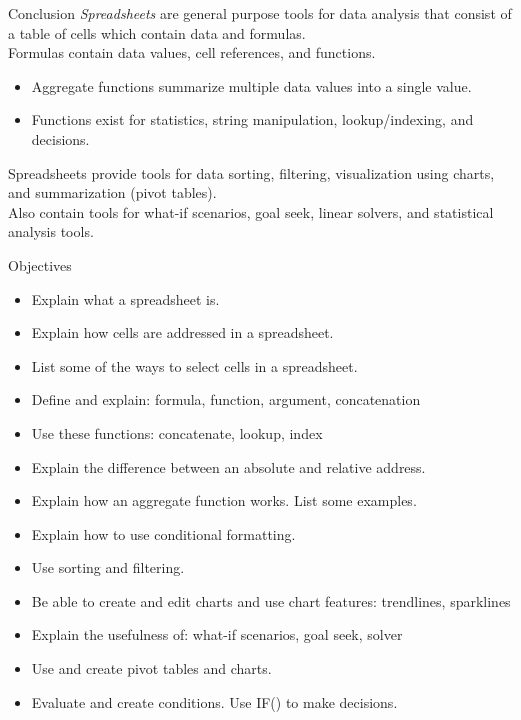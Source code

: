 \documentclass[xcolor=svgnames, handout]{beamer}
\begin{document}
\begin{frame}[label=current]{Conclusion}
\emph{Spreadsheets} are general purpose tools for data analysis that consist of a table of cells which contain data and formulas.\\[1em]
Formulas contain data values, cell references, and functions.
\begin{itemize}
\item Aggregate functions summarize multiple data values into a single value.
\item Functions exist for statistics, string manipulation, lookup/indexing, and decisions.
\end{itemize}
Spreadsheets provide tools for data sorting, filtering, visualization using charts, and summarization (pivot tables).  \\[1em]
Also contain tools for what-if scenarios, goal seek, linear solvers, and statistical analysis tools.
\end{frame}

\begin{frame}{Objectives}
\begin{itemize}
\item Explain what a spreadsheet is.
\item Explain how cells are addressed in a spreadsheet.
\item List some of the ways to select cells in a spreadsheet.
\item Define and explain: formula, function, argument, concatenation
\item Use these functions: concatenate, lookup, index
\item Explain the difference between an absolute and relative address.
\item Explain how an aggregate function works.  List some examples.
\item Explain how to use conditional formatting.
\item  Use sorting and filtering.
\item Be able to create and edit charts and use chart features: trendlines, sparklines
\item Explain the usefulness of: what-if scenarios, goal seek, solver
\item Use and create pivot tables and charts.
\item Evaluate and create conditions. Use IF() to make decisions.
\end{itemize}
\end{frame}
\end{document}
